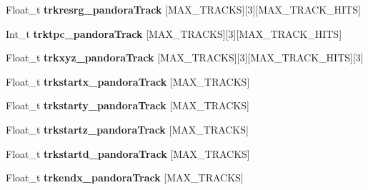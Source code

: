 \begin{DoxyCompactItemize}
\item 
\hypertarget{classanatree_a95549a4120ced04bca8ddfed88f2ef36}{Float\-\_\-t {\bfseries trkresrg\-\_\-pandora\-Track} \mbox{[}M\-A\-X\-\_\-\-T\-R\-A\-C\-K\-S\mbox{]}\mbox{[}3\mbox{]}\mbox{[}M\-A\-X\-\_\-\-T\-R\-A\-C\-K\-\_\-\-H\-I\-T\-S\mbox{]}}\label{classanatree_a95549a4120ced04bca8ddfed88f2ef36}

\item 
\hypertarget{classanatree_a398371428049d52930f2545c31a9e15e}{Int\-\_\-t {\bfseries trktpc\-\_\-pandora\-Track} \mbox{[}M\-A\-X\-\_\-\-T\-R\-A\-C\-K\-S\mbox{]}\mbox{[}3\mbox{]}\mbox{[}M\-A\-X\-\_\-\-T\-R\-A\-C\-K\-\_\-\-H\-I\-T\-S\mbox{]}}\label{classanatree_a398371428049d52930f2545c31a9e15e}

\item 
\hypertarget{classanatree_a62e9898ef8a4d6bc9929f5e8c058ad25}{Float\-\_\-t {\bfseries trkxyz\-\_\-pandora\-Track} \mbox{[}M\-A\-X\-\_\-\-T\-R\-A\-C\-K\-S\mbox{]}\mbox{[}3\mbox{]}\mbox{[}M\-A\-X\-\_\-\-T\-R\-A\-C\-K\-\_\-\-H\-I\-T\-S\mbox{]}\mbox{[}3\mbox{]}}\label{classanatree_a62e9898ef8a4d6bc9929f5e8c058ad25}

\item 
\hypertarget{classanatree_ab465442cb1d2f550e8f2b702b0a04000}{Float\-\_\-t {\bfseries trkstartx\-\_\-pandora\-Track} \mbox{[}M\-A\-X\-\_\-\-T\-R\-A\-C\-K\-S\mbox{]}}\label{classanatree_ab465442cb1d2f550e8f2b702b0a04000}

\item 
\hypertarget{classanatree_af0abb36deb6c63c9faea5f7d68738d92}{Float\-\_\-t {\bfseries trkstarty\-\_\-pandora\-Track} \mbox{[}M\-A\-X\-\_\-\-T\-R\-A\-C\-K\-S\mbox{]}}\label{classanatree_af0abb36deb6c63c9faea5f7d68738d92}

\item 
\hypertarget{classanatree_a9e39d6a03eec25296bebc762fba3725a}{Float\-\_\-t {\bfseries trkstartz\-\_\-pandora\-Track} \mbox{[}M\-A\-X\-\_\-\-T\-R\-A\-C\-K\-S\mbox{]}}\label{classanatree_a9e39d6a03eec25296bebc762fba3725a}

\item 
\hypertarget{classanatree_ab68e19c86f192013127b72bf110742fe}{Float\-\_\-t {\bfseries trkstartd\-\_\-pandora\-Track} \mbox{[}M\-A\-X\-\_\-\-T\-R\-A\-C\-K\-S\mbox{]}}\label{classanatree_ab68e19c86f192013127b72bf110742fe}

\item 
\hypertarget{classanatree_a7b98607750a75c31e93911fd2a6b7d93}{Float\-\_\-t {\bfseries trkendx\-\_\-pandora\-Track} \mbox{[}M\-A\-X\-\_\-\-T\-R\-A\-C\-K\-S\mbox{]}}\label{classanatree_a7b98607750a75c31e93911fd2a6b7d93}


\end{DoxyCompactItemize}

